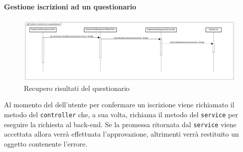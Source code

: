 \paragraph{Gestione iscrizioni ad un questionario}
\label{Gestione iscrizioni ad un questionario}

\begin{figure}[ht]
	\centering
	\includegraphics[scale=0.25,keepaspectratio]{UML/DiagrammiDiSequenza/Front-end/SubscriptionManagement.png}
	\caption{Recupero risultati del questionario}
\end{figure} \FloatBarrier
 
Al momento del dell'utente per confermare un iscrizione viene richiamato il metodo del \texttt{controller} che, a sua volta, richiama il metodo del \texttt{service} per eseguire la richiesta al back-end. Se la promessa ritornata dal \texttt{service} viene accettata allora verrà effettuata l'approvazione, altrimenti verrà restituito un oggetto contenente l'errore.

